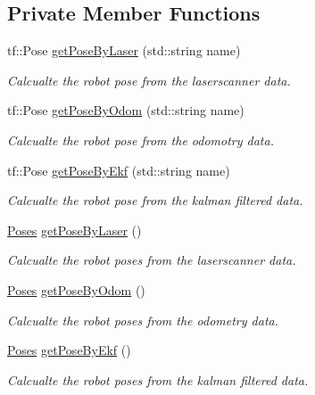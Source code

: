 \subsection*{Private Member Functions}
\begin{DoxyCompactItemize}
\item 
tf\+::\+Pose \hyperlink{classFormation_a58f07e7658e834f031b41d43c69bf105}{get\+Pose\+By\+Laser} (std\+::string name)
\begin{DoxyCompactList}\small\item\em Calcualte the robot pose from the laserscanner data. \end{DoxyCompactList}\item 
tf\+::\+Pose \hyperlink{classFormation_a51658d7a848dd8281d78391b50c17c07}{get\+Pose\+By\+Odom} (std\+::string name)
\begin{DoxyCompactList}\small\item\em Calcualte the robot pose from the odomotry data. \end{DoxyCompactList}\item 
tf\+::\+Pose \hyperlink{classFormation_ac02aaa23f0736c5ebc396f598f24ffda}{get\+Pose\+By\+Ekf} (std\+::string name)
\begin{DoxyCompactList}\small\item\em Calcualte the robot pose from the kalman filtered data. \end{DoxyCompactList}\item 
\hyperlink{classFormation_ae679dc0b3c837ce510678f0fd98baf36}{Poses} \hyperlink{classFormation_a84a8884d35fd3b2b0a2d13a524813582}{get\+Pose\+By\+Laser} ()
\begin{DoxyCompactList}\small\item\em Calcualte the robot poses from the laserscanner data. \end{DoxyCompactList}\item 
\hyperlink{classFormation_ae679dc0b3c837ce510678f0fd98baf36}{Poses} \hyperlink{classFormation_a65f7219eae228db0bca8929192e17e6d}{get\+Pose\+By\+Odom} ()
\begin{DoxyCompactList}\small\item\em Calcualte the robot poses from the odometry data. \end{DoxyCompactList}\item 
\hyperlink{classFormation_ae679dc0b3c837ce510678f0fd98baf36}{Poses} \hyperlink{classFormation_aa1abf9f7770254bfe43fa030c2557d3c}{get\+Pose\+By\+Ekf} ()
\begin{DoxyCompactList}\small\item\em Calcualte the robot poses from the kalman filtered data. \end{DoxyCompactList}\item 

\end{DoxyCompactItemize}
